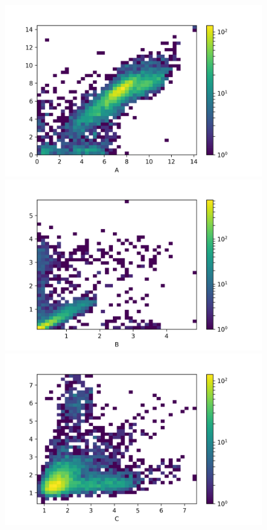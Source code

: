 \documentclass[11pt]{amsart}
\begin{document}
\begin{figure}[H]
  \includegraphics[width=\textwidth]{t_rate.png}
\endminipage
{}
  \includegraphics[width=\textwidth]{act.png}
  \endminipage
  \includegraphics[width=\textwidth]{in_act.png}

\end{figure}
\end{document}

